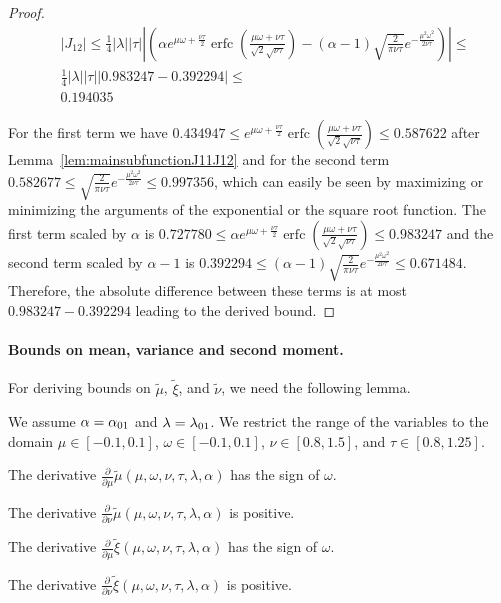 \documentclass{article}
\newcommand\munn{{\tilde \mu}}
\newcommand\nunn{{\tilde \nu}}
\newcommand\xinn{{\tilde \xi}}
\renewcommand{\leq}{\leqslant}
\DeclareMathOperator{\erfc}{erfc}
\begin{document}
\begin{proof}

\begin{align}
& |J_{12}| \leq 
\frac{1}{4} |\lambda|  |\tau| 
\left| \left( \alpha  e^{\mu \omega+\frac{\nu \tau}{2}} \erfc \left(\frac{\mu \omega+\nu \tau}{\sqrt{2} \sqrt{\nu \tau}}\right) 
-  (\alpha-1) \sqrt{\frac{2}{\pi  \nu \tau}} e^{-\frac{\mu^2\omega^2}{2 \nu \tau}} \right) \right| \leq \nonumber \\
& \frac{1}{4} |\lambda|  |\tau| \left|  0.983247-0.392294 \right|  \leq \nonumber \\
& 0.194035
\end{align}

For the first term we have $0.434947 \leq e^{\mu \omega+\frac{\nu \tau}{2}} \erfc \left(\frac{\mu \omega+\nu \tau}{\sqrt{2} \sqrt{\nu \tau}} \right) \leq 0.587622$  after 
Lemma~\ref{lem:mainsubfunctionJ11J12} and for the second term $0.582677 \leq \sqrt{\frac{2}{\pi  \nu \tau}} e^{-\frac{\mu^2\omega^2}{2 \nu \tau}} \leq 0.997356$, which can easily be seen
by maximizing or minimizing the arguments of the exponential or the square root function. The first term scaled by $\alpha$ is
$0.727780 \leq \alpha e^{\mu \omega+\frac{\nu \tau}{2}} \erfc \left(\frac{\mu \omega+\nu \tau}{\sqrt{2} \sqrt{\nu \tau}} \right) \leq 0.983247$
and the second term scaled by $\alpha-1$ is
$0.392294 \leq (\alpha-1)\sqrt{\frac{2}{\pi  \nu \tau}} e^{-\frac{\mu^2\omega^2}{2 \nu \tau}} \leq 0.671484$.
Therefore, the absolute difference between these terms is at most $0.983247-0.392294$
leading to the derived bound.



\end{proof}




\paragraph{Bounds on mean, variance and second moment.}
For deriving bounds on $\munn$, $\xinn$, and $\nunn$, we need 
the following lemma.

\begin{lemma}
\label{lem:mapDerivatives}
We assume $\alpha = \alpha_{\rm 01}$ and $\lambda=\lambda_{\rm 01}$.
We restrict the range of the variables to the domain
$\mu \in [-0.1,0.1]$,
$\omega \in [-0.1,0.1]$,
$\nu \in [0.8,1.5]$, and
$\tau \in [0.8,1.25]$.

The derivative $\frac{\partial }{\partial \mu}
\munn(\mu,\omega,\nu,\tau,\lambda ,\alpha )$
has the sign of $\omega$.

The derivative $\frac{\partial }{\partial \nu} \munn(\mu,\omega,\nu,\tau,\lambda ,\alpha )$
is positive.

The derivative $\frac{\partial }{\partial \mu } \xinn(\mu,\omega,\nu,\tau,\lambda ,\alpha )$
has the sign of $\omega$.

The derivative 
$\frac{\partial }{\partial \nu } \xinn(\mu,\omega,\nu,\tau,\lambda ,\alpha )$
is positive.
\end{lemma}
\end{document}
